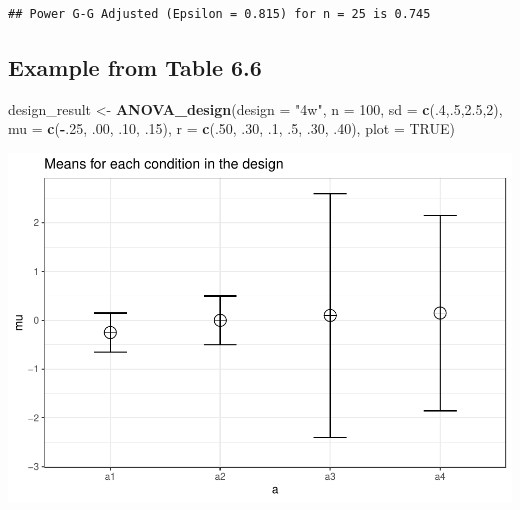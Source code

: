 \documentclass[
]{book}
\newenvironment{Shaded}{\begin{snugshade}}{\end{snugshade}}
\newcommand{\DataTypeTok}[1]{\textcolor[rgb]{0.13,0.29,0.53}{#1}}
\newcommand{\DecValTok}[1]{\textcolor[rgb]{0.00,0.00,0.81}{#1}}
\newcommand{\FloatTok}[1]{\textcolor[rgb]{0.00,0.00,0.81}{#1}}
\newcommand{\KeywordTok}[1]{\textcolor[rgb]{0.13,0.29,0.53}{\textbf{#1}}}
\newcommand{\NormalTok}[1]{#1}
\newcommand{\OperatorTok}[1]{\textcolor[rgb]{0.81,0.36,0.00}{\textbf{#1}}}
\newcommand{\OtherTok}[1]{\textcolor[rgb]{0.56,0.35,0.01}{#1}}
\newcommand{\StringTok}[1]{\textcolor[rgb]{0.31,0.60,0.02}{#1}}
\begin{document}
\begin{verbatim}
## Power G-G Adjusted (Epsilon = 0.815) for n = 25 is 0.745
\end{verbatim}

\hypertarget{example-from-table-6.6}{%
\subsection{Example from Table 6.6}\label{example-from-table-6.6}}

\begin{Shaded}
\begin{Highlighting}[]
\NormalTok{design_result <-}\StringTok{ }\KeywordTok{ANOVA_design}\NormalTok{(}\DataTypeTok{design =} \StringTok{"4w"}\NormalTok{,}
                              \DataTypeTok{n =} \DecValTok{100}\NormalTok{,}
                              \DataTypeTok{sd =} \KeywordTok{c}\NormalTok{(.}\DecValTok{4}\NormalTok{,.}\DecValTok{5}\NormalTok{,}\FloatTok{2.5}\NormalTok{,}\DecValTok{2}\NormalTok{),}
                              \DataTypeTok{mu =} \KeywordTok{c}\NormalTok{(}\OperatorTok{-}\NormalTok{.}\DecValTok{25}\NormalTok{, }\FloatTok{.00}\NormalTok{, }\FloatTok{.10}\NormalTok{, }\FloatTok{.15}\NormalTok{),}
                              \DataTypeTok{r =} \KeywordTok{c}\NormalTok{(.}\DecValTok{50}\NormalTok{, }
                                    \FloatTok{.30}\NormalTok{,}
                                    \FloatTok{.1}\NormalTok{, }
                                    \FloatTok{.5}\NormalTok{,}
                                    \FloatTok{.30}\NormalTok{, }
                                    \FloatTok{.40}\NormalTok{),}
                              \DataTypeTok{plot =} \OtherTok{TRUE}\NormalTok{)}
\end{Highlighting}
\end{Shaded}

\includegraphics{SuperpowerValidation_files/figure-latex/aberson_6.6-1.pdf}
\end{document}
